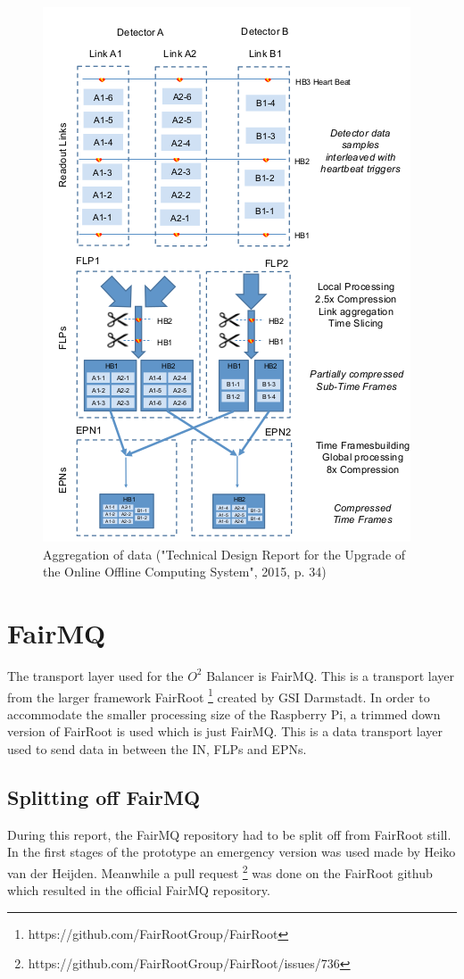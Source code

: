 \begin{figure}
	\centering
	\includegraphics[scale=1]{./graphics/data_aggregation.png}
	\caption{Aggregation of data ("Technical Design Report for the Upgrade of the Online Offline Computing System", 2015, p. 34)}
\end{figure}

\section{FairMQ}
The transport layer used for the $O^2$ Balancer is FairMQ. This is a transport layer from the larger framework FairRoot \footnote{https://github.com/FairRootGroup/FairRoot} created by GSI Darmstadt. In order to accommodate the smaller processing size of the Raspberry Pi, a trimmed down version of FairRoot is used which is just FairMQ. This is a data transport layer used to send data in between the IN, FLPs and EPNs. 
\subsection{Splitting off FairMQ}
During this report, the FairMQ repository had to be split off from FairRoot still. In the first stages of the prototype an emergency version was used made by Heiko van der Heijden. Meanwhile a pull request 
\footnote{https://github.com/FairRootGroup/FairRoot/issues/736} was done on the FairRoot github which resulted in the official FairMQ repository.


